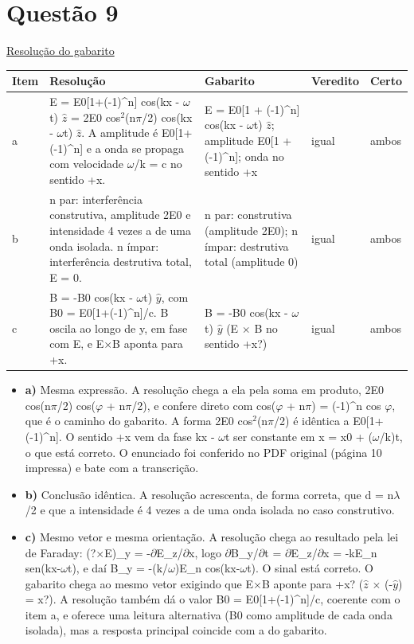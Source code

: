 \documentclass{article}%
\begin{document}
\section*{Questão 9}%
\href{https://poliedroresolve.sistemapoliedro.com.br/vestibulares/ita/2027/ita-2-fase-dia-3-22-10-2026-2-fase-dia-3/dissertativa-9-fisica-2-fase-dia-3-ita-2027}{Resolução do gabarito}\par\smallskip%
\begin{longtable}{@{}p{} p{} p{} p{} p{}@{}}\toprule Item & Resolução & Gabarito & Veredito & Certo \\ \midrule
a & E = E0{[}1+({-}1)\^{}n{]} cos(kx - $\omega$t) $\hat z$ = 2E0 cos$^2$(n$\pi$/2) cos(kx - $\omega$t) $\hat z$. A amplitude é E0{[}1+({-}1)\^{}n{]} e a onda se propaga com velocidade $\omega$/k = c no sentido +x. & E = E0{[}1 + (-1)\^{}n{]} cos(kx - $\omega$t) $\hat z$; amplitude E0{[}1 + (-1)\^{}n{]}; onda no sentido +x & igual & ambos \\
b & n par: interferência construtiva, amplitude 2E0 e intensidade 4 vezes a de uma onda isolada. n ímpar: interferência destrutiva total, E = 0. & n par: construtiva (amplitude 2E0); n ímpar: destrutiva total (amplitude 0) & igual & ambos \\
c & B = -B0 cos(kx - $\omega$t) $\hat y$, com B0 = E0{[}1+(-1)\^{}n{]}/c. B oscila ao longo de y, em fase com E, e E$\times$B aponta para +x. & B = -B0 cos(kx - $\omega$t) $\hat y$ (E $\times$ B no sentido +x?) & igual & ambos \\
\bottomrule\end{longtable}%
\begin{itemize}%
\item%
\textbf{a)} Mesma expressão. A resolução chega a ela pela soma em produto, 2E0 cos(n$\pi$/2) cos($\varphi$ + n$\pi$/2), e confere direto com cos($\varphi$ + n$\pi$) = (-1)\^{}n cos $\varphi$, que é o caminho do gabarito. A forma 2E0 cos$^2$(n$\pi$/2) é idêntica a E0{[}1+(-1)\^{}n{]}. O sentido +x vem da fase kx - $\omega$t ser constante em x = x0 + ($\omega$/k)t, o que está correto. O enunciado foi conferido no PDF original (página 10 impressa) e bate com a transcrição.%
\item%
\textbf{b)} Conclusão idêntica. A resolução acrescenta, de forma correta, que d = n$\lambda$/2 e que a intensidade é 4 vezes a de uma onda isolada no caso construtivo.%
\item%
\textbf{c)} Mesmo vetor e mesma orientação. A resolução chega ao resultado pela lei de Faraday: (?$\times$E)\_y = -$\partial$E\_z/$\partial$x, logo $\partial$B\_y/$\partial$t = $\partial$E\_z/$\partial$x = -kE\_n sen(kx-$\omega$t), e daí B\_y = -(k/$\omega$)E\_n cos(kx-$\omega$t). O sinal está correto. O gabarito chega ao mesmo vetor exigindo que E$\times$B aponte para +x? ($\hat z$ $\times$ (-$\hat y$) = x?). A resolução também dá o valor B0 = E0{[}1+(-1)\^{}n{]}/c, coerente com o item a, e oferece uma leitura alternativa (B0 como amplitude de cada onda isolada), mas a resposta principal coincide com a do gabarito.%
\end{itemize}%
\end{document}
